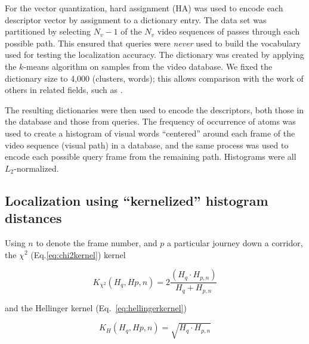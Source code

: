 For the vector quantization, hard assignment (HA) was used to encode each descriptor vector by assignment to a dictionary entry. The data set was partitioned by selecting $N_v-1$ of the $N_v$ video sequences of passes through each possible path. This ensured that queries were {\em never} used to build the vocabulary used for testing the localization accuracy. The dictionary was created by applying the $k$-means algorithm on samples from the video database.  We fixed the dictionary size to 4,000 (clusters, words); this allows comparison with the work of others in related fields, such as \cite{chatfield2011devil}.

The resulting dictionaries were then used to encode the descriptors, both those in the database and those from queries.  The frequency of occurrence of atoms was used to create a histogram of visual words ``centered'' around each frame of the video sequence (visual path) in a database, and the same process was used to encode each possible query frame from the remaining path. Histograms were all $L_2$-normalized.

\subsection{Localization using ``kernelized'' histogram distances}
\label{sec:methods}

Using $n$ to denote the frame number, and $p$ a particular journey down a corridor, the 
$\chi^2$ (Eq.\ref{eq:chi2kernel}) kernel

\begin{equation}
K_{\chi^2}(H_q, H{p,n}) =  2 \frac{(H_q \cdot H_{p,n})}{H_q+H_{p,n}}
\label{eq:chi2kernel}
\end{equation}

and the Hellinger kernel (Eq.~\ref{eq:hellingerkernel})

\begin{equation}
K_{H}(H_q, H{p,n}) =  \sqrt{H_q \cdot H_{p,n}}
\label{eq:hellingerkernel}
\end{equation}

